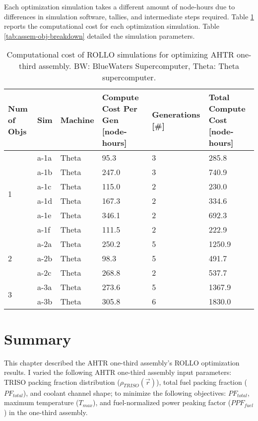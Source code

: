 Each optimization simulation takes a different amount of node-hours due to 
differences in simulation software, tallies, and intermediate steps required. 
Table \ref{tab:assem-compute-cost} reports the computational cost for each optimization 
simulation. 
Table \ref{tab:assem-obj-breakdown} detailed the simulation parameters.
\begin{table}[htbp!]
    \centering
    \onehalfspacing
    \caption{Computational cost of \acrfull{ROLLO} simulations for optimizing 
    \acrfull{AHTR} one-third assembly. BW: BlueWaters Supercomputer, Theta: Theta 
    supercomputer.}
	\label{tab:assem-compute-cost}
    \footnotesize
    \begin{tabular}{p{1.4cm}|p{1.5cm}lp{3.5cm}lp{3cm}}
        \hline 
        \textbf{Num of Objs} & \textbf{Sim} & \textbf{Machine} & 
        \textbf{Compute Cost Per Gen [node-hours]} &\textbf{Generations [\#]} & 
        \textbf{Total Compute Cost [node-hours]} \\
        \hline
    \multirow{6}{2cm}{1} 
    & a-1a & Theta &  95.3 & 3 & 285.8 \\
    & a-1b & Theta & 247.0 & 3 & 740.9 \\
    & a-1c & Theta & 115.0 & 2 & 230.0 \\
    & a-1d & Theta & 167.3 & 2 & 334.6 \\
    & a-1e & Theta & 346.1 & 2 & 692.3 \\
    & a-1f & Theta & 111.5 & 2 & 222.9 \\
    \hline
    \multirow{3}{2cm}{2}
    & a-2a & Theta & 250.2 & 5 & 1250.9 \\
    & a-2b & Theta &  98.3 & 5 &  491.7 \\
    & a-2c & Theta & 268.8 & 2 &  537.7 \\
    \hline
    \multirow{2}{2cm}{3}
    & a-3a & Theta & 273.6 & 5 & 1367.9 \\
    & a-3b & Theta & 305.8 & 6 & 1830.0 \\
    \hline
    \end{tabular}
\end{table}

\pagebreak
\section{Summary}
\glsresetall
This chapter described the \gls{AHTR} one-third assembly's \gls{ROLLO} optimization 
results. 
I varied the following \gls{AHTR} one-third assembly input parameters: \gls{TRISO} 
packing fraction distribution ($\rho_{TRISO}(\vec{r})$), total fuel packing fraction 
($PF_{total}$), and coolant channel shape; to minimize the following 
objectives: $PF_{total}$, maximum temperature ($T_{max}$), and fuel-normalized power 
peaking factor ($PPF_{fuel}$) in the one-third assembly. 

